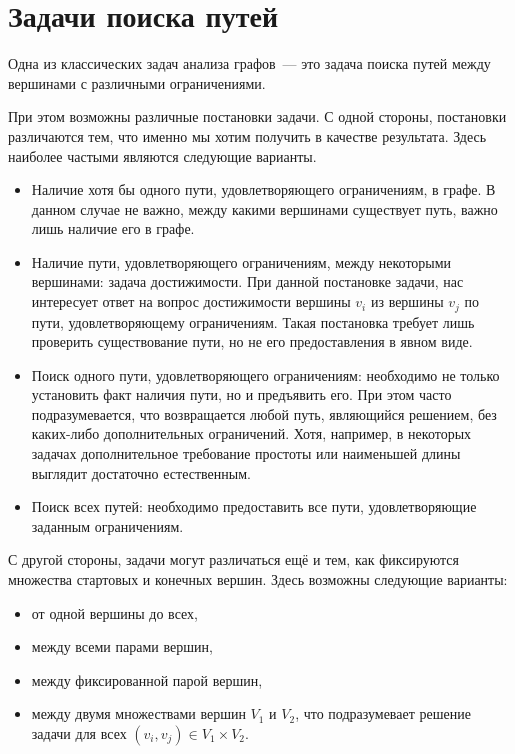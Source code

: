 \section{Задачи поиска путей}

Одна из классических задач анализа графов~--- это задача поиска путей между вершинами с различными ограничениями.

При этом возможны различные постановки задачи.
С одной стороны, постановки различаются тем, что именно мы хотим получить в качестве результата. Здесь наиболее частыми являются следующие варианты.

\begin{itemize}
    \item Наличие хотя бы одного пути, удовлетворяющего ограничениям, в графе.
          В данном случае не важно, между какими вершинами существует путь, важно лишь наличие его в графе.
    \item Наличие пути, удовлетворяющего ограничениям, между некоторыми вершинами: задача достижимости.
          При данной постановке задачи, нас интересует ответ на вопрос достижимости вершины $v_i$ из вершины $v_j$ по пути, удовлетворяющему ограничениям.
          Такая постановка требует лишь проверить существование пути, но не его предоставления в явном виде.
    \item Поиск одного пути, удовлетворяющего ограничениям: необходимо не только установить факт наличия пути, но и  предъявить его.
          При этом часто подразумевается, что возвращается любой путь, являющийся решением, без каких-либо дополнительных ограничений.
          Хотя, например, в некоторых задачах дополнительное требование простоты или наименьшей длины выглядит достаточно естественным.
    \item Поиск всех путей: необходимо предоставить все пути, удовлетворяющие заданным ограничениям.
\end{itemize}

С другой стороны, задачи могут различаться ещё и тем, как фиксируются множества стартовых и конечных вершин.
Здесь возможны следующие варианты:
\begin{itemize}
    \item от одной вершины до всех,
    \item между всеми парами вершин,
    \item между фиксированной парой вершин,
    \item между двумя множествами вершин $V_1$ и $V_2$, что подразумевает решение задачи для всех $(v_i,v_j) \in V_1 \times V_2$.
\end{itemize}


